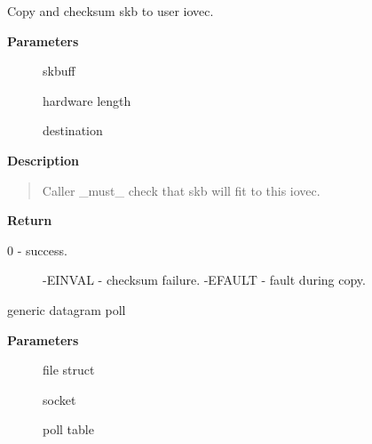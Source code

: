 \documentclass[a4paper,8pt,english]{sphinxmanual}
\begin{document}
\begin{fulllineitems}
\label{networking/kapi:c.skb_copy_and_csum_datagram_msg}
Copy and checksum skb to user iovec.

\end{fulllineitems}


\textbf{Parameters}
\begin{description}
\item[{}] \leavevmode
skbuff

\item[{}] \leavevmode
hardware length

\item[{}] \leavevmode
destination

\end{description}

\textbf{Description}
\begin{quote}

Caller \_must\_ check that skb will fit to this iovec.
\end{quote}

\textbf{Return}
\begin{description}
\item[{0       - success.}] \leavevmode
-EINVAL - checksum failure.
-EFAULT - fault during copy.

\end{description}

\begin{fulllineitems}
\label{networking/kapi:c.datagram_poll}
generic datagram poll

\end{fulllineitems}


\textbf{Parameters}
\begin{description}
\item[{}] \leavevmode
file struct

\item[{}] \leavevmode
socket

\item[{}] \leavevmode
poll table

\end{description}
\end{document}
